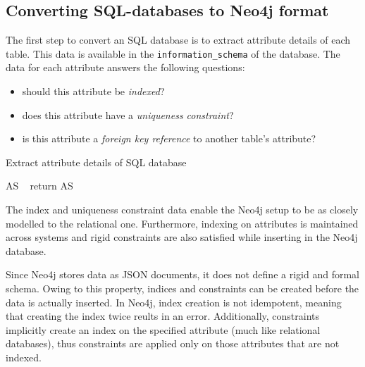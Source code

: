 \documentclass[12pt]{article}
\begin{document}
    \subsection{Converting SQL-databases to Neo4j format}
    The first step to convert an SQL database is to extract attribute details of each table. This data is available in the \verb|information_schema| of the database. The data for each attribute answers the following questions:
    \begin{itemize}
        \item should this attribute be \textit{indexed}?
        \item does this attribute have a \textit{uniqueness constraint}?
        \item is this attribute a \textit{foreign key reference} to another table's attribute?
    \end{itemize}

    \begin{algorithm}[htb!]
        \SetAlgoLined
        \label{algo:sql_attr_extract}
        \caption{Extract attribute details of SQL database}
        AS \gets\ \phi{}
        return AS\;
    \end{algorithm}

    The index and uniqueness constraint data enable the Neo4j setup to be as closely modelled to the relational one. Furthermore, indexing on attributes is maintained across systems and rigid constraints are also satisfied while inserting in the Neo4j database.

    Since Neo4j stores data as JSON documents, it does not define a rigid and formal schema. Owing to this property, indices and constraints can be created before the data is actually inserted. In Neo4j, index creation is not idempotent, meaning that creating the index twice reults in an error. Additionally, constraints implicitly create an index on the specified attribute (much like relational databases), thus constraints are applied only on those attributes that are not indexed.
\end{document}
